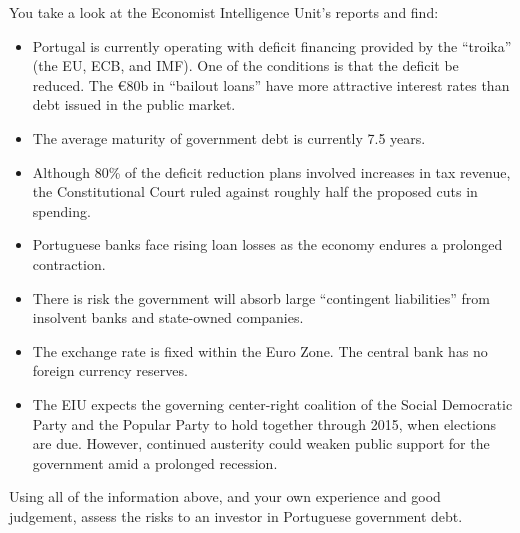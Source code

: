 \documentclass[letterpaper,12pt]{exam}
\begin{document}
\begin{questions}
You take a look at the Economist Intelligence Unit's reports
and find:
\begin{itemize}
\item Portugal is currently operating with deficit financing
provided by the ``troika'' (the EU, ECB, and IMF).
One of the conditions is that the deficit be reduced.
The \euro 80b in ``bailout loans'' have more attractive interest rates
than debt issued in the public market.

\item The average maturity of government debt is currently 7.5 years.

\item Although 80\% of the deficit reduction plans involved increases in
tax revenue, the Constitutional Court ruled against roughly half the proposed
cuts in spending.

\item Portuguese banks face rising loan losses as the economy endures a prolonged
contraction.

\item There is risk the government will absorb large
``contingent liabilities'' from insolvent banks and state-owned companies.

\item The exchange rate is fixed within the Euro Zone.
The central bank has no foreign currency reserves.

\item The EIU expects the governing center-right coalition
of the Social Democratic Party and the Popular Party
to hold together through 2015, when elections are due.
However, continued austerity could weaken public support for the government
amid a prolonged recession.
\end{itemize}

Using all of the information above, and your own experience and good judgement,
assess the risks to an investor in Portuguese government debt.
\end{questions}
\end{document}
